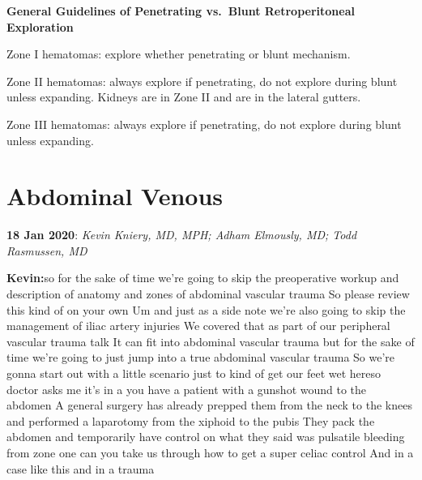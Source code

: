 \documentclass[
]{book}
\begin{document}
\textbf{General Guidelines of Penetrating vs.~Blunt Retroperitoneal Exploration}

Zone I hematomas: explore whether penetrating or blunt mechanism.

Zone II hematomas: always explore if penetrating, do not explore during blunt unless expanding. Kidneys are in Zone II and are in the lateral gutters.

Zone III hematomas: always explore if penetrating, do not explore during blunt unless expanding.

\hypertarget{abdominal-venous}{%
\section{Abdominal Venous}\label{abdominal-venous}}

\textbf{18 Jan 2020}: \emph{Kevin Kniery, MD, MPH; Adham Elmously, MD; Todd
Rasmussen, MD}

\textbf{Kevin:}so for the sake of time we're going to skip the preoperative
workup and description of anatomy and zones of abdominal vascular trauma
So please review this kind of on your own Um and just as a side note
we're also going to skip the management of iliac artery injuries We
covered that as part of our peripheral vascular trauma talk It can fit
into abdominal vascular trauma but for the sake of time we're going to
just jump into a true abdominal vascular trauma So we're gonna start out
with a little scenario just to kind of get our feet wet hereso doctor
asks me it's in a you have a patient with a gunshot wound to the abdomen
A general surgery has already prepped them from the neck to the knees
and performed a laparotomy from the xiphoid to the pubis They pack the
abdomen and temporarily have control on what they said was pulsatile
bleeding from zone one can you take us through how to get a super celiac
control And in a case like this and in a trauma
\end{document}

